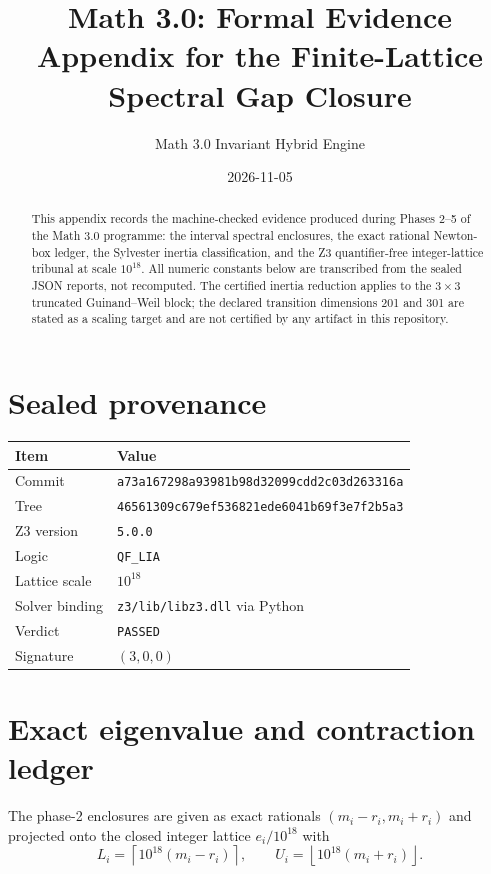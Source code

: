 \documentclass[11pt]{article}
\title{Math 3.0: Formal Evidence Appendix for the Finite-Lattice\\Spectral Gap Closure}
\author{Math 3.0 Invariant Hybrid Engine}
\date{2026-11-05}
\newcommand{\code}[1]{\texttt{#1}}
\begin{document}
\maketitle

\begin{abstract}
This appendix records the machine-checked evidence produced during Phases 2--5 of the Math 3.0 programme: the interval spectral enclosures, the exact rational Newton-box ledger, the Sylvester inertia classification, and the Z3 quantifier-free integer-lattice tribunal at scale $10^{18}$. All numeric constants below are transcribed from the sealed JSON reports, not recomputed. The certified inertia reduction applies to the $3 \times 3$ truncated Guinand--Weil block; the declared transition dimensions 201 and 301 are stated as a scaling target and are not certified by any artifact in this repository.
\end{abstract}

\section{Sealed provenance}

\begin{center}
\begin{tabular}{@{}ll@{}}
\toprule
Item & Value \\
\midrule
Commit & \code{a73a167298a93981b98d32099cdd2c03d263316a} \\
Tree & \code{46561309c679ef536821ede6041b69f3e7f2b5a3} \\
Z3 version & \code{5.0.0} \\
Logic & \code{QF_LIA} \\
Lattice scale & $10^{18}$ \\
Solver binding & \code{z3/lib/libz3.dll} via Python \\
Verdict & \code{PASSED} \\
Signature & $(3,0,0)$ \\
\bottomrule
\end{tabular}
\end{center}

\section{Exact eigenvalue and contraction ledger}

The phase-2 enclosures are given as exact rationals $(m_i - r_i, m_i + r_i)$ and projected onto the closed integer lattice $e_i/10^{18}$ with
\[
L_i = \left\lceil 10^{18}(m_i - r_i) \right\rceil, \qquad
U_i = \left\lfloor 10^{18}(m_i + r_i) \right\rfloor .
\]
\end{document}
